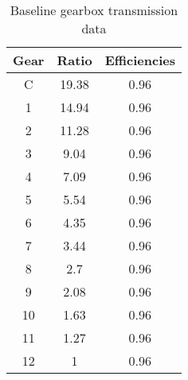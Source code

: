 \begin{table}[H]
	\centering\footnotesize
	\begin{threeparttable}

		\begin{tabulary}{\textwidth}{ccc}
			\toprule
			Gear & Ratio & Efficiencies\\
			\midrule
			C     & 19.38 & 0.96 \\
			1     & 14.94 & 0.96 \\
			2     & 11.28 & 0.96 \\
			3     & 9.04  & 0.96 \\
			4     & 7.09  & 0.96 \\
			5     & 5.54  & 0.96 \\
			6     & 4.35  & 0.96 \\
			7     & 3.44  & 0.96 \\
			8     & 2.7   & 0.96 \\
			9     & 2.08  & 0.96 \\
			10    & 1.63  & 0.96 \\
			11    & 1.27  & 0.96 \\
			12    & 1     & 0.96 \\
			\bottomrule
		\end{tabulary}

		\caption{Baseline gearbox transmission data}
		\label{table:baseline-gearbox-transmission-data}


	\end{threeparttable}
\end{table}

